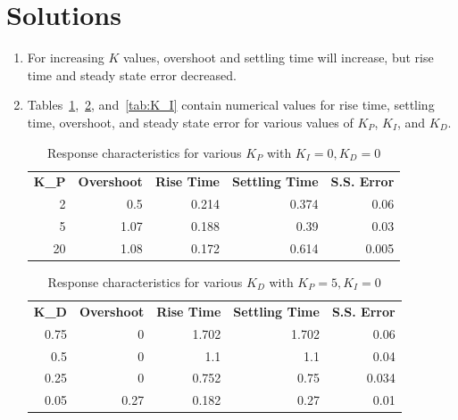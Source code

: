 \documentclass[letterpaper, 11pt, openany]{book}
\begin{document}
\section{Solutions}
\begin{enumerate}
\item For increasing $K$ values, overshoot and settling time will increase, but rise time and steady state error 
decreased.
\item Tables~\ref{tab:K_P},~\ref{tab:K_D}, and~\ref{tab:K_I} contain numerical values for rise time, 
settling time, overshoot, and steady state error for various values of $K_P$, $K_I$, and $K_D$.

\begin{table}[htbp]
  \centering
  \caption{Response characteristics for various $K_P$ with $K_I = 0, K_D = 0$}
    \begin{tabular}{rrrrr}
    \multicolumn{1}{l}{\textbf{K\_P}} & \multicolumn{1}{l}{\textbf{Overshoot}} & \multicolumn{1}{l}{\textbf{Rise Time}} & \multicolumn{1}{l}{\textbf{Settling Time}} & \multicolumn{1}{l}{\textbf{S.S. Error}} \\
    2     & 0.5   & 0.214 & 0.374 & 0.06 \\
    5     & 1.07  & 0.188 & 0.39  & 0.03 \\
    20    & 1.08  & 0.172 & 0.614 & 0.005 \\
    \end{tabular}%
  \label{tab:K_P}%
\end{table}%

\begin{table}[htbp]
  \centering
  \caption{Response characteristics for various $K_D$ with $K_P = 5, K_I = 0$}
    \begin{tabular}{rrrrr}
    \multicolumn{1}{l}{\textbf{K\_D}} & \multicolumn{1}{l}{\textbf{Overshoot}} & \multicolumn{1}{l}{\textbf{Rise Time}} & \multicolumn{1}{l}{\textbf{Settling Time}} & \multicolumn{1}{l}{\textbf{S.S. Error}} \\
    0.75  & 0     & 1.702 & 1.702 & 0.06 \\
    0.5   & 0     & 1.1   & 1.1   & 0.04 \\
    0.25  & 0     & 0.752 & 0.75  & 0.034 \\
    0.05  & 0.27  & 0.182 & 0.27  & 0.01 \\
    \end{tabular}%
  \label{tab:K_D}%
\end{table}%


\end{enumerate}
\end{document}
